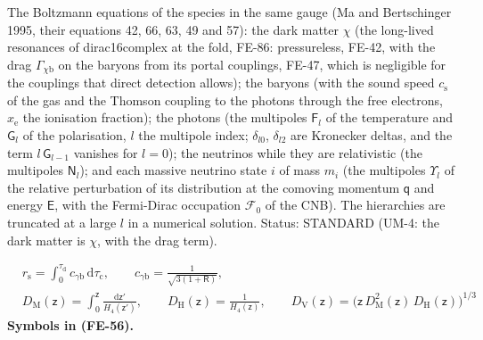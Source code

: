 \documentclass[
  10pt,
]{article}
\begin{document}
The Boltzmann equations of the species in the same gauge (Ma and
Bertschinger 1995, their equations 42, 66, 63, 49 and 57): the dark
matter \(\chi\) (the long-lived resonances of dirac16complex at the
fold, FE-86: pressureless, FE-42, with the drag
\(\Gamma_{\chi\mathrm{b}}\) on the baryons from its portal couplings,
FE-47, which is negligible for the couplings that direct detection
allows); the baryons (with the sound speed \(c_{\mathrm{s}}\) of the gas
and the Thomson coupling to the photons through the free electrons,
\(x_{\mathrm{e}}\) the ionisation fraction); the photons (the multipoles
\(\mathsf{F}_l\) of the temperature and \(\mathsf{G}_l\) of the
polarisation, \(l\) the multipole index; \(\delta_{l0}\),
\(\delta_{l2}\) are Kronecker deltas, and the term
\(l\,\mathsf{G}_{l-1}\) vanishes for \(l = 0\)); the neutrinos while
they are relativistic (the multipoles \(\mathsf{N}_l\)); and each
massive neutrino state \(i\) of mass \(m_i\) (the multipoles
\(\Upsilon_l\) of the relative perturbation of its distribution at the
comoving momentum \(\mathsf{q}\) and energy \(\mathsf{E}\), with the
Fermi-Dirac occupation \(\mathcal{F}_0\) of the CNB). The hierarchies
are truncated at a large \(l\) in a numerical solution. Status: STANDARD
(UM-4: the dark matter is \(\chi\), with the drag term).

\[
\begin{aligned}
&r_{\mathrm{s}} = \int_0^{\tau_{\mathrm{d}}}c_{\gamma\mathrm{b}}\,\mathrm{d}\tau_{\mathrm{c}},\qquad c_{\gamma\mathrm{b}} = \frac{1}{\sqrt{3(1 + \mathsf{R})}},\\
&D_{\mathrm{M}}(\mathsf{z}) = \int_0^{\mathsf{z}}\frac{\mathrm{d}\mathsf{z}'}{H_4(\mathsf{z}')},\qquad
 D_{\mathrm{H}}(\mathsf{z}) = \frac{1}{H_4(\mathsf{z})},\qquad
 D_{\mathrm{V}}(\mathsf{z}) = \big(\mathsf{z}\,D_{\mathrm{M}}^2(\mathsf{z})\,D_{\mathrm{H}}(\mathsf{z})\big)^{1/3}
\end{aligned} \tag{FE-56}
\] \textbf{Symbols in (FE-56).}
\end{document}
